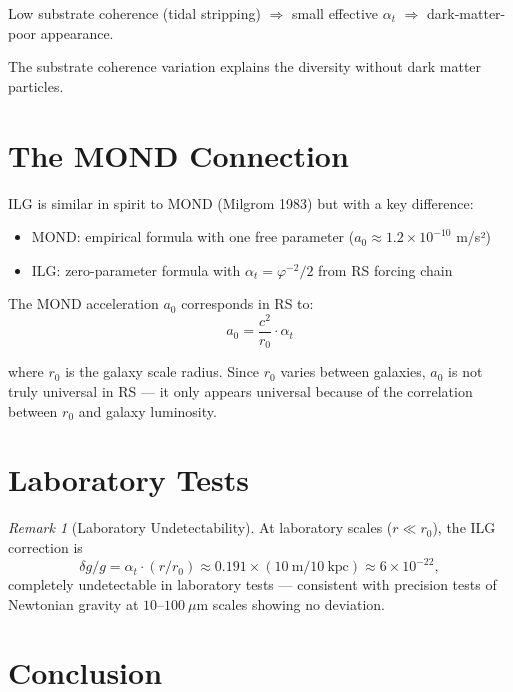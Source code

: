 \documentclass[12pt,a4paper]{article}
\theoremstyle{definition}
\theoremstyle{remark}
\newtheorem{remark}[theorem]{Remark}
\begin{document}
Low substrate coherence (tidal stripping) $\Rightarrow$ small effective $\alpha_t$ 
$\Rightarrow$ dark-matter-poor appearance.

The substrate coherence variation explains the diversity without dark matter particles.

\section{The MOND Connection}

ILG is similar in spirit to MOND (Milgrom 1983) but with a key difference:
\begin{itemize}
\item MOND: empirical formula with one free parameter ($a_0 \approx 1.2 \times 10^{-10}$ m/s²)
\item ILG: zero-parameter formula with $\alpha_t = \varphi^{-2}/2$ from RS forcing chain
\end{itemize}

The MOND acceleration $a_0$ corresponds in RS to:
\begin{equation}
a_0 = \frac{c^2}{r_0} \cdot \alpha_t
\end{equation}

where $r_0$ is the galaxy scale radius. Since $r_0$ varies between galaxies, 
$a_0$ is not truly universal in RS — it only appears universal because of the 
correlation between $r_0$ and galaxy luminosity.

\section{Laboratory Tests}

\begin{remark}[Laboratory Undetectability]
At laboratory scales ($r \ll r_0$), the ILG correction is
\begin{equation}
\delta g / g = \alpha_t \cdot (r/r_0) \approx 0.191 \times (10~\mathrm{m} / 10~\mathrm{kpc}) 
\approx 6 \times 10^{-22},
\end{equation}
completely undetectable in laboratory tests --- consistent with precision tests of 
Newtonian gravity at $10$--$100~\mu$m scales showing no deviation.
\end{remark}

\section{Conclusion}
\end{document}
